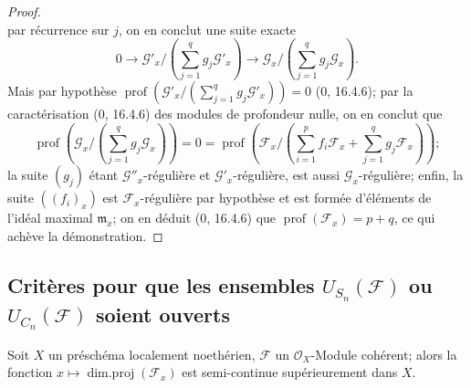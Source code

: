 \begin{proof}
\[\]
par récurrence sur $j$, on en conclut une suite exacte
\[
0\longrightarrow\mathcal G'_x/
\left(\sum_{j=1}^{q}g_j\mathcal G'_x\right)
\longrightarrow\mathcal G_x/
\left(\sum_{j=1}^{q}g_j\mathcal G_x\right).
\]
Mais par hypothèse
$\operatorname{prof}(\mathcal G'_x/(\sum_{j=1}^{q}g_j\mathcal G'_x))=0$
(0, 16.4.6); par la caractérisation (0, 16.4.6) des modules de profondeur
nulle, on en conclut que
\[
\operatorname{prof}\left(\mathcal G_x/
\left(\sum_{j=1}^{q}g_j\mathcal G_x\right)\right)=0
=\operatorname{prof}\left(\mathcal F_x/
\left(\sum_{i=1}^{p}f_i\mathcal F_x+
\sum_{j=1}^{q}g_j\mathcal F_x\right)\right);
\]
la suite $(g_j)$ étant $\mathcal G''_x$-régulière et
$\mathcal G'_x$-régulière, est aussi $\mathcal G_x$-régulière; enfin, la
suite $((f_i)_x)$ est $\mathcal F_x$-régulière par hypothèse et est formée
d'éléments de l'idéal maximal $\mathfrak m_x$; on en déduit (0, 16.4.6)
que $\operatorname{prof}(\mathcal F_x)=p+q$, ce qui achève la
démonstration.
\end{proof}

\subsection{Critères pour que les ensembles
$U_{S_n}(\mathcal F)$ ou $U_{C_n}(\mathcal F)$ soient ouverts}
\label{IV.2.s6.11-fr}

\begin{lemma}[6.11.1]
\label{IV.2.s6.11.1-fr}
Soit $X$ un préschéma localement noethérien, $\mathcal F$ un
$\mathcal O_X$-Module cohérent; alors la fonction
$x\mapsto\operatorname{dim.proj}(\mathcal F_x)$ est semi-continue
supérieurement dans $X$.
\end{lemma}

